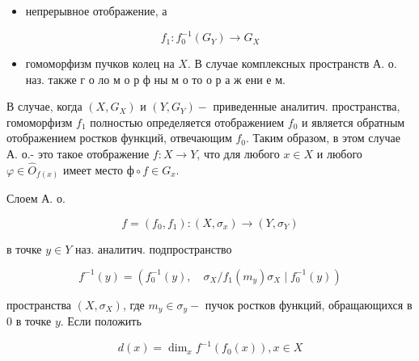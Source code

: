 \documentclass[10pt]{article}
\begin{document}
\begin{itemize}

  \item непрерывное отображение, а

\end{itemize}



\[

f_{1}: f_{0}^{-1}\left(G_{Y}\right) \rightarrow G_{X}

\]



\begin{itemize}

  \item гомоморфизм пучков колец на $X$. В случае комплексных пространств А. о. наз. также г о ло м о р ф ны м о то о р а ж ени е м.

\end{itemize}



В случае, когда $\left(X, G_{X}\right)$ и $\left(Y, G_{Y}\right)-$ приведенные аналитич. пространства, гомоморфизм $f_{1}$ полностью определяется отображением $f_{0}$ и является обратным отображением ростков функций, отвечающим $f_{0}$. Таким образом, в этом случае А. о.- это такое отображение $f: X \rightarrow Y$, что для любого $x \in X$ и любого $\varphi \in \widehat{O}_{f(x)}$ имеет место $ф \circ f \in G_{x}$.



Слоем А. о.



\[

f=\left(f_{0}, f_{1}\right):\left(X, \sigma_{x}\right) \longrightarrow\left(Y, \sigma_{Y}\right)

\]



в точке $y \in Y$ наз. аналитич. подпространство



\[

f^{-1}(y)=\left(f_{0}^{-1}(y), \quad \sigma_{X} / f_{1}\left(m_{y}\right) \sigma_{X} \mid f_{0}^{-1}(y)\right)

\]



пространства $\left(X, \sigma_{X}\right)$, где $m_{y} \in \sigma_{y}-$ пучок ростков функций, обращающихся в 0 в точке $y$. Если положить



\[

d(x)=\operatorname{dim}_{x} f^{-1}\left(f_{0}(x)\right), x \in X

\]
\end{document}
